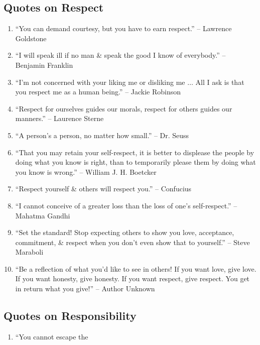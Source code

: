 \documentclass{article}
\begin{document}
\subsection{Quotes on Respect}

\begin{enumerate}
	\item ``You can demand courtesy, but you have to earn respect.'' -- Lawrence Goldstone
	\item ``I will speak ill if no man \& speak the good I know of everybody.'' -- Benjamin Franklin
	\item ``I'm not concerned with your liking me or disliking me $\ldots$ All I ask is that you respect me as a human being.'' -- Jackie Robinson
	\item ``Respect for ourselves guides our morals, respect for others guides our manners.'' -- Laurence Sterne
	\item ``A person's a person, no matter how small.'' -- Dr. Seuss
	\item ``That you may retain your self-respect, it is better to displease the people by doing what you know is right, than to temporarily please them by doing what you know is wrong.'' -- William J. H. Boetcker
	\item ``Respect yourself \& others will respect you.'' -- Confucius
	\item ``I cannot conceive of a greater loss than the loss of one's self-respect.'' -- Mahatma Gandhi
	\item ``Set the standard! Stop expecting others to show you love, acceptance, commitment, \& respect when you don't even show that to yourself.'' -- Steve Maraboli
	\item ``Be a reflection of what you'd like to see in others! If you want love, give love. If you want honesty, give honesty. If you want respect, give respect. You get in return what you give!'' -- Author Unknown
\end{enumerate}

\subsection{Quotes on Responsibility}

\begin{enumerate}
	\item ``You cannot escape the
\end{enumerate}

\end{document}
